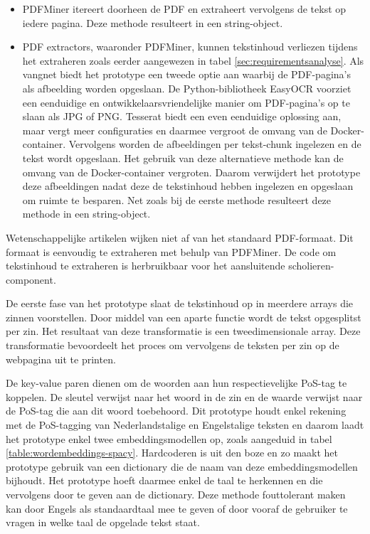 \begin{itemize}
	\item PDFMiner itereert doorheen de PDF en extraheert vervolgens de tekst op iedere pagina. Deze methode resulteert in een string-object.
	\item PDF extractors, waaronder PDFMiner, kunnen tekstinhoud verliezen tijdens het extraheren zoals eerder aangewezen in tabel \ref{sec:requirementsanalyse}. Als vangnet biedt het prototype een tweede optie aan waarbij de PDF-pagina's als afbeelding worden opgeslaan. De Python-bibliotheek EasyOCR voorziet een eenduidige en ontwikkelaarsvriendelijke manier om PDF-pagina's op te slaan als JPG of PNG. Tesserat biedt een even eenduidige oplossing aan, maar vergt meer configuraties en daarmee vergroot de omvang van de Docker-container. Vervolgens worden de afbeeldingen per tekst-chunk ingelezen en de tekst wordt opgeslaan. Het gebruik van deze alternatieve methode kan de omvang van de Docker-container vergroten. Daarom verwijdert het prototype deze afbeeldingen nadat deze de tekstinhoud hebben ingelezen en opgeslaan om ruimte te besparen. Net zoals bij de eerste methode resulteert deze methode in een string-object.
\end{itemize}

Wetenschappelijke artikelen wijken niet af van het standaard PDF-formaat. Dit formaat is eenvoudig te extraheren met behulp van PDFMiner. De code om tekstinhoud te extraheren is herbruikbaar voor het aansluitende scholieren-component.


\medspace

De eerste fase van het prototype slaat de tekstinhoud op in meerdere arrays die zinnen voorstellen. Door middel van een aparte functie wordt de tekst opgesplitst per zin. Het resultaat van deze transformatie is een tweedimensionale array. Deze transformatie bevoordeelt het proces om vervolgens de teksten per zin op de webpagina uit te printen. 

\medspace

De key-value paren dienen om de woorden aan hun respectievelijke PoS-tag te koppelen. De sleutel verwijst naar het woord in de zin en de waarde verwijst naar de PoS-tag die aan dit woord toebehoord.  Dit prototype houdt enkel rekening met de PoS-tagging van Nederlandstalige en Engelstalige teksten en daarom laadt het prototype enkel twee embeddingsmodellen op, zoals aangeduid in tabel \ref{table:wordembeddings-spacy}. Hardcoderen is uit den boze en zo maakt het prototype gebruik van een dictionary die de naam van deze embeddingsmodellen bijhoudt. Het prototype hoeft daarmee enkel de taal te herkennen en die vervolgens door te geven aan de dictionary. Deze methode fouttolerant maken kan door Engels als standaardtaal mee te geven of door vooraf de gebruiker te vragen in welke taal de opgelade tekst staat.

